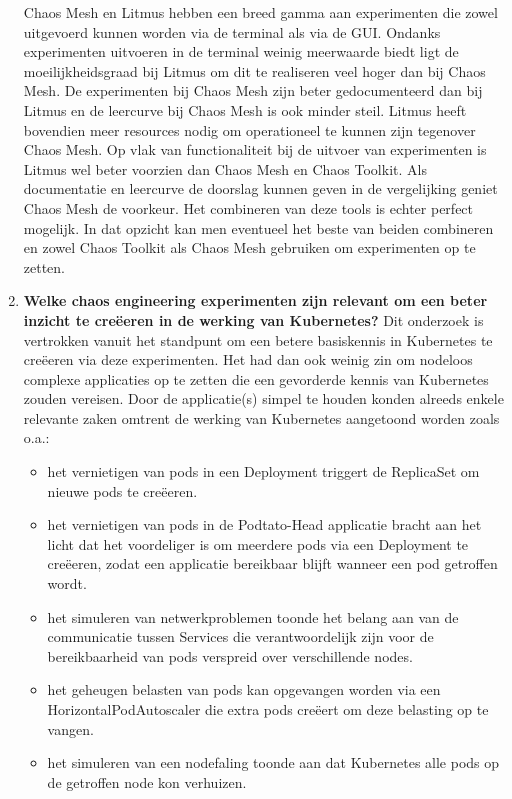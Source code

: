 \begin{enumerate}
\newline Chaos Mesh en Litmus hebben een breed gamma aan experimenten die zowel uitgevoerd kunnen worden via de terminal als via de GUI. Ondanks experimenten uitvoeren in de terminal weinig meerwaarde biedt ligt de moeilijkheidsgraad bij Litmus om dit te realiseren veel hoger dan bij Chaos Mesh. De experimenten bij Chaos Mesh zijn beter gedocumenteerd dan bij Litmus en de leercurve bij Chaos Mesh is ook minder steil. Litmus heeft bovendien meer resources nodig om operationeel te kunnen zijn tegenover Chaos Mesh. Op vlak van functionaliteit bij de uitvoer van experimenten is Litmus wel beter voorzien dan Chaos Mesh en Chaos Toolkit. Als documentatie en leercurve de doorslag kunnen geven in de vergelijking geniet Chaos Mesh de voorkeur. Het combineren van deze tools is echter perfect mogelijk. In dat opzicht kan men eventueel het beste van beiden combineren en zowel Chaos Toolkit als Chaos Mesh gebruiken om experimenten op te zetten.   
\newline 
\item {\bf Welke chaos engineering experimenten zijn relevant om een beter inzicht te creëeren in de werking van Kubernetes?}  
\newline Dit onderzoek is vertrokken vanuit het standpunt om een betere basiskennis in Kubernetes te creëeren via deze experimenten. Het had dan ook weinig zin om nodeloos complexe applicaties op te zetten die een gevorderde kennis van Kubernetes zouden vereisen. Door de applicatie(s) simpel te houden konden alreeds enkele relevante zaken omtrent de werking van Kubernetes aangetoond worden zoals o.a.: 
\begin{itemize}
    \item het vernietigen van pods in een Deployment triggert de ReplicaSet om nieuwe pods te creëeren.
    \item het vernietigen van pods in de Podtato-Head applicatie bracht aan het licht dat het voordeliger is om meerdere pods via een Deployment te creëeren, zodat een applicatie bereikbaar blijft wanneer een pod getroffen wordt.
    \item het simuleren van netwerkproblemen toonde het belang aan van de communicatie tussen Services die verantwoordelijk zijn voor de bereikbaarheid van pods verspreid over verschillende nodes.      
    \item het geheugen belasten van pods kan opgevangen worden via een HorizontalPodAutoscaler die extra pods creëert om deze belasting op te vangen.
    \item het simuleren van een nodefaling toonde aan dat Kubernetes alle pods op de getroffen node kon verhuizen. 

\end{itemize}
\end{enumerate}
